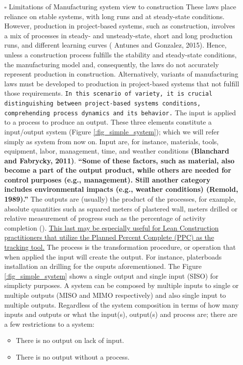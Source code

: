 \documentclass{article}
\begin{document}
\begin{itemize}
\item[{$\square$}] Limitations of Manufacturing system view to construction
These laws place reliance on stable systems, with long runs and at steady-state conditions.
However, production in project-based systems, such as construction, involves a mix of processes in steady- and unsteady-state, short and long production runs, and different learning curves (\citep{Antunes2015} Antunes and Gonzalez, 2015).
Hence, unless a construction process fulfills the stability and steady-state conditions, the manufacturing model and, consequently, the laws do not accurately represent production in construction.
Alternatively, variants of manufacturing laws must be developed to production in project-based systems that not fulfill those requirements.
\texttt{In this scenario of variety, it is crucial distinguishing between project-based systems conditions, comprehending process dynamics and its behavior.}
  The input is applied to a process to produce an output.
These three elements constitute a input/output system (Figure \ref{:fig_simple_system});  which we will refer simply as system from now on.
Input are, for instance, materials, tools, equipment, labor, management, time, and weather conditions \textbf{(Blanchard and Fabrycky, 2011)}.
\textbf{``Some of these factors, such as material, also become a part of the output product, while others are needed for control purposes (e.g., management).
Still another category includes environmental impacts (e.g., weather conditions) (Remold, 1989).''}
The outputs are (usually) the product of the processes, for example, absolute quantities such as squared meters of plastered wall, meters drilled or relative measurement of progress such as the percentage of activity completion (\citep{Antunes2016}).
\uline{This last may be especially useful for Lean Construction practitioners that utilize the Planned Percent Complete (PPC) as the tracking tool.}
The process is the transformation procedure, or operation that when applied the input will create the output.
For instance, platerboads installation an drilling for the ouputs aforementioned.
The Figure \ref{:fig_simple_system} shows a single output and single input (SISO) for simplicty purposes.
A system can be composed by multiple inputs to single or multiple outputs (MISO and MIMO respectively) and also single input to multiple outputs.
Regardless of the system composition in terms of how many inputs and outputs or what the input(s), output(s) and process are; there are a few restrictions to a system:
\begin{itemize}
\item There is no output on lack of input.
\item There is no output without a process.
\end{itemize}
\end{itemize}
\end{document}
